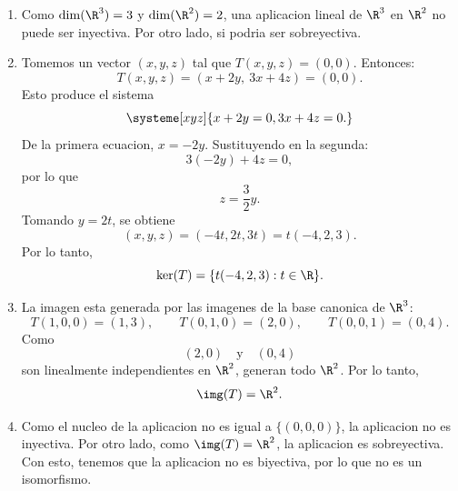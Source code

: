 \documentclass[11pt,respuestas,a4]{aleph-examen}
\begin{document}
\begin{preguntas}
\begin{respuesta}
\begin{enumerate}[leftmargin=*]
\item
    Como $\dim(\R^3)=3$ y $\dim(\R^2)=2$, una aplicacion lineal de $\R^3$ en $\R^2$ no puede ser inyectiva. Por otro lado, si podria ser sobreyectiva.
\item
    Tomemos un vector $(x,y,z)$ tal que $T(x,y,z)=(0,0)$. Entonces:
    \[
        T(x,y,z)=(x+2y,\ 3x+4z)=(0,0).
    \]
    Esto produce el sistema
    \[
        \systeme[xyz]{
            x+2y = 0,
            3x+4z = 0.
        }
    \]
    De la primera ecuacion, $x=-2y$. Sustituyendo en la segunda:
    \[
        3(-2y)+4z=0,
    \]
    por lo que
    \[
        z=\frac{3}{2}y.
    \]
    Tomando $y=2t$, se obtiene
    \[
        (x,y,z)=(-4t,2t,3t)=t(-4,2,3).
    \]
    Por lo tanto,
    \[
        \ker(T)=\{t(-4,2,3):t\in\R\}.
    \]
\item
    La imagen esta generada por las imagenes de la base canonica de $\R^3$:
    \[
        T(1,0,0)=(1,3),\qquad
        T(0,1,0)=(2,0),\qquad
        T(0,0,1)=(0,4).
    \]
    Como
    \[
        (2,0)
        \quad\text{y}\quad
        (0,4)
    \]
    son linealmente independientes en $\R^2$, generan todo $\R^2$. Por lo tanto,
    \[
        \img(T)=\R^2.
    \]
\item
    Como el nucleo de la aplicacion no es igual a $\{(0,0,0)\}$, la aplicacion no es inyectiva. Por otro lado, como $\img(T)=\R^2$, la aplicacion es sobreyectiva. Con esto, tenemos que la aplicacion no es biyectiva, por lo que no es un isomorfismo.\qedhere
\end{enumerate}
\end{respuesta}

\end{preguntas}
\end{document}
